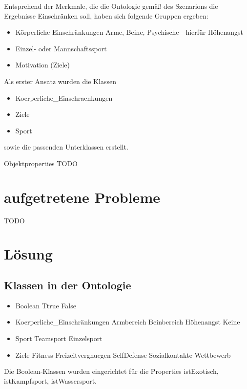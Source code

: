 Entsprehend der Merkmale, die die Ontologie gemäß des Szenarions die Ergebnisse Einschränken soll, haben sich folgende Gruppen ergeben:

\begin{itemize}
	\item Körperliche Einschränkungen
	Arme, Beine, Psychische - hierfür Höhenangst
	\item Einzel- oder Mannschaftssport
	\item Motivation (Ziele)
\end{itemize}

Als erster Ansatz wurden die Klassen

\begin{itemize}
	\item Koerperliche\_Einschraenkungen
	\item Ziele
	\item Sport
\end{itemize}

sowie die passenden Unterklassen erstellt. 

Objektproperties
TODO

\section{aufgetretene Probleme}
TODO 

\section{Lösung}

\subsection{Klassen in der Ontologie}

\begin{itemize}
	\item Boolean
	\subitem Ttrue
	\subitem False
	\item Koerperliche\_Einschränkungen	
	\subitem Armbereich
	\subitem Beinbereich
	\subitem Höhenangst
	\subitem Keine
	\item Sport
	\subitem Teamsport
	\subitem Einzelsport

	\item Ziele
	\subitem Fitness
	\subitem Freizeitvergnuegen
	\subitem SelfDefense
	\subitem Sozialkontakte
	\subitem Wettbewerb
\end{itemize}
Die Boolean-Klassen wurden eingerichtet für die Properties istExotisch, istKampfsport, istWassersport. 

